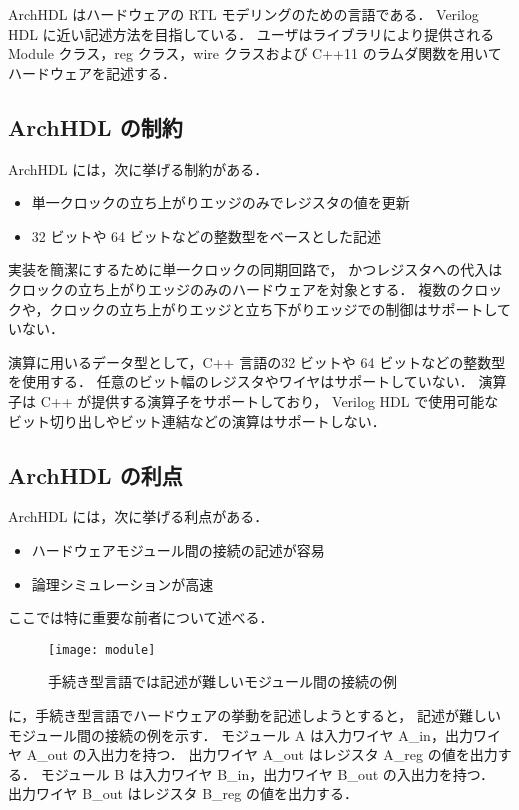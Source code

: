 ArchHDL はハードウェアの RTL モデリングのための言語である．
Verilog HDL に近い記述方法を目指している．
ユーザはライブラリにより提供される Module クラス，reg クラス，wire クラスおよび C++11 のラムダ関数を用いて
ハードウェアを記述する．

\subsection{ArchHDL の制約}

ArchHDL には，次に挙げる制約がある．

\begin{itemize}
 \item 単一クロックの立ち上がりエッジのみでレジスタの値を更新
 \item 32 ビットや 64 ビットなどの整数型をベースとした記述
\end{itemize}

実装を簡潔にするために単一クロックの同期回路で，
かつレジスタへの代入はクロックの立ち上がりエッジのみのハードウェアを対象とする．
複数のクロックや，クロックの立ち上がりエッジと立ち下がりエッジでの制御はサポートしていない．

演算に用いるデータ型として，C++ 言語の32 ビットや 64 ビットなどの整数型を使用する．
任意のビット幅のレジスタやワイヤはサポートしていない．
演算子は C++ が提供する演算子をサポートしており，
Verilog HDL で使用可能なビット切り出しやビット連結などの演算はサポートしない．

\subsection{ArchHDL の利点}

ArchHDL には，次に挙げる利点がある．

\begin{itemize}
 \item ハードウェアモジュール間の接続の記述が容易
 \item 論理シミュレーションが高速
\end{itemize}
ここでは特に重要な前者について述べる．

\begin{figure}[t]
 \centering
 \texttt{[image: module]}
 \caption{手続き型言語では記述が難しいモジュール間の接続の例}
 \label{fig:module}
\end{figure}

 に，手続き型言語でハードウェアの挙動を記述しようとすると，
記述が難しいモジュール間の接続の例を示す．
モジュール A は入力ワイヤ A\_in，出力ワイヤ A\_out の入出力を持つ．
出力ワイヤ A\_out はレジスタ A\_reg の値を出力する．
モジュール B は入力ワイヤ B\_in，出力ワイヤ B\_out の入出力を持つ．
出力ワイヤ B\_out はレジスタ B\_reg の値を出力する．

